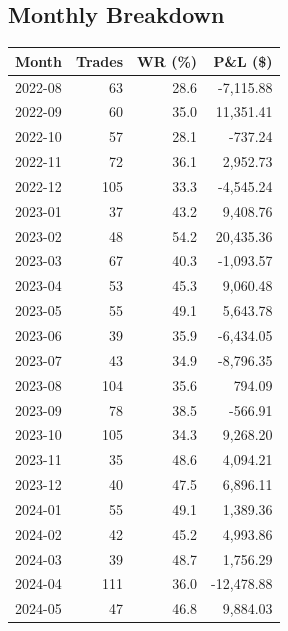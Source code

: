 \documentclass[11pt,a4paper,twoside]{article}
\begin{document}
\subsection{Monthly Breakdown}
\noindent\begin{center}
\begin{tabular}{>{\color{txtmain}}l rrr}
\toprule
\rowcolor{cardbg}
\textbf{Month} & \textbf{Trades} & \textbf{WR (\%)} & \textbf{P\&L (\$)} \\
\midrule
2022-08 & 63 & 28.6 & \textcolor{lossred}{-7,115.88} \\
2022-09 & 60 & 35.0 & \textcolor{wingreen}{11,351.41} \\
2022-10 & 57 & 28.1 & \textcolor{lossred}{-737.24} \\
2022-11 & 72 & 36.1 & \textcolor{wingreen}{2,952.73} \\
2022-12 & 105 & 33.3 & \textcolor{lossred}{-4,545.24} \\
2023-01 & 37 & 43.2 & \textcolor{wingreen}{9,408.76} \\
2023-02 & 48 & 54.2 & \textcolor{wingreen}{20,435.36} \\
2023-03 & 67 & 40.3 & \textcolor{lossred}{-1,093.57} \\
2023-04 & 53 & 45.3 & \textcolor{wingreen}{9,060.48} \\
2023-05 & 55 & 49.1 & \textcolor{wingreen}{5,643.78} \\
2023-06 & 39 & 35.9 & \textcolor{lossred}{-6,434.05} \\
2023-07 & 43 & 34.9 & \textcolor{lossred}{-8,796.35} \\
2023-08 & 104 & 35.6 & \textcolor{wingreen}{794.09} \\
2023-09 & 78 & 38.5 & \textcolor{lossred}{-566.91} \\
2023-10 & 105 & 34.3 & \textcolor{wingreen}{9,268.20} \\
2023-11 & 35 & 48.6 & \textcolor{wingreen}{4,094.21} \\
2023-12 & 40 & 47.5 & \textcolor{wingreen}{6,896.11} \\
2024-01 & 55 & 49.1 & \textcolor{wingreen}{1,389.36} \\
2024-02 & 42 & 45.2 & \textcolor{wingreen}{4,993.86} \\
2024-03 & 39 & 48.7 & \textcolor{wingreen}{1,756.29} \\
2024-04 & 111 & 36.0 & \textcolor{lossred}{-12,478.88} \\
2024-05 & 47 & 46.8 & \textcolor{wingreen}{9,884.03} \\

\end{tabular}
\end{center}
\end{document}
